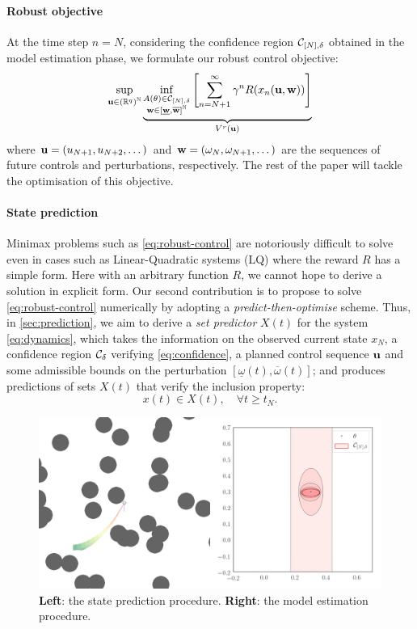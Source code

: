 \documentclass{article}
\begin{document}
\paragraph{Robust objective}

At the time step $n=N$, considering the confidence region $\mathcal{C}_{[N],\delta}$ obtained in the model estimation phase, we formulate our robust control objective:
\begin{equation}
\label{eq:robust-control}
\sup_{\mathbf{u}\in{(\mathbb{R}^q)}^{\mathbb{N}}} \underbrace{\inf_{\substack{A(\theta) \in \mathcal{C}_{[N],\delta} \\ \mathbf{w}\in[\underline{\mathbf{w}},\overline{\mathbf{w}}]^{\mathbb{N}}}} \left[\sum_{n=N+1}^\infty \gamma^n R(x_n(\mathbf{u},\mathbf{w}))\right]}_{V^r(\mathbf{u})}
\end{equation}
where $\mathbf{u} = (u_{N+1},u_{N+2},\dots)$ and $\mathbf{w} = (\omega_N, \omega_{N+1},\dots)$ are the sequences of future controls and perturbations, respectively. The rest of the paper will tackle the optimisation of this objective.

\paragraph{State prediction}

Minimax problems such as \eqref{eq:robust-control} are notoriously difficult to solve even in cases such as Linear-Quadratic systems (LQ) where the reward $R$ has a simple form. Here with an arbitrary function $R$, we cannot hope to derive a solution in explicit form. Our second contribution is to propose to solve \eqref{eq:robust-control} numerically by adopting a \emph{predict-then-optimise} scheme. Thus, in \autoref{sec:prediction}, we aim to derive a \emph{set predictor} $X(t)$ for the system \eqref{eq:dynamics}, which takes the information on the observed current state ${x}_N$, a confidence region $\mathcal{C}_\delta$ verifying \eqref{eq:confidence}, a planned control sequence $\mathbf{u}$ and some admissible bounds on the perturbation $[\underline{\omega}(t),\overline{\omega}(t)]$; and produces predictions of sets $X(t)$ that verify the inclusion property:
\begin{equation}
 x(t)\in X(t),\quad\forall t\geq t_N.
\end{equation}

\begin{figure}
    \centering
    \includegraphics[width=\linewidth]{img/epc-friction}
    \caption{\textbf{Left}: the state prediction procedure. \textbf{Right}: the model estimation procedure.}
    \label{fig:interval-hull}
\end{figure}
\end{document}
